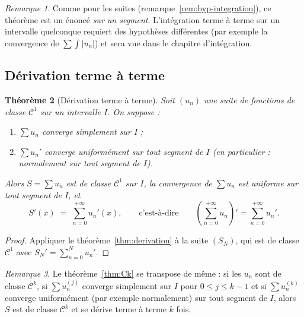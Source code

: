 \documentclass[11pt,a4paper]{article}
\theoremstyle{plain}
\newtheorem{theoreme}{Théorème}[section]
\theoremstyle{definition}
\theoremstyle{remark}
\newtheorem{remarque}[theoreme]{Remarque}
\numberwithin{equation}{section}
\begin{document}
\begin{remarque}
Comme pour les suites (remarque~\ref{rem:hyp-integration}), ce théorème
est un énoncé \emph{sur un segment}. L'intégration terme à terme sur un
intervalle quelconque requiert des hypothèses différentes (par exemple la
convergence de $\sum\int\lvert u_n\rvert$) et sera vue dans le chapitre
d'intégration.
\end{remarque}

\subsection{Dérivation terme à terme}

\begin{theoreme}[Dérivation terme à terme]\label{thm:derivation-series}
Soit $(u_n)$ une suite de fonctions de classe $\mathcal{C}^1$ sur un
intervalle $I$. On suppose :
\begin{enumerate}[label=(\roman*)]
    \item $\sum u_n$ converge simplement sur $I$ ;
    \item $\sum u_n'$ converge uniformément sur tout segment de $I$ (en
    particulier : normalement sur tout segment de $I$).
\end{enumerate}
Alors $S=\sum u_n$ est de classe $\mathcal{C}^1$ sur $I$, la convergence
de $\sum u_n$ est uniforme sur tout segment de $I$, et
\[
    S'(x) \;=\; \sum_{n=0}^{+\infty} u_n'(x),
    \qquad\text{c'est-à-dire}\qquad
    \left(\sum_{n=0}^{+\infty} u_n\right)'
    = \sum_{n=0}^{+\infty} u_n' .
\]
\end{theoreme}

\begin{proof}
Appliquer le théorème~\ref{thm:derivation} à la suite $(S_N)$, qui est de
classe $\mathcal{C}^1$ avec $S_N' = \sum_{n=0}^N u_n'$.
\end{proof}

\begin{remarque}
Le théorème~\ref{thm:Ck} se transpose de même : si les $u_n$ sont de
classe $\mathcal{C}^k$, si $\sum u_n^{(j)}$ converge simplement sur $I$
pour $0\leq j\leq k-1$ et si $\sum u_n^{(k)}$ converge uniformément (par
exemple normalement) sur tout segment de $I$, alors $S$ est de classe
$\mathcal{C}^k$ et se dérive terme à terme $k$ fois.
\end{remarque}

\end{document}
